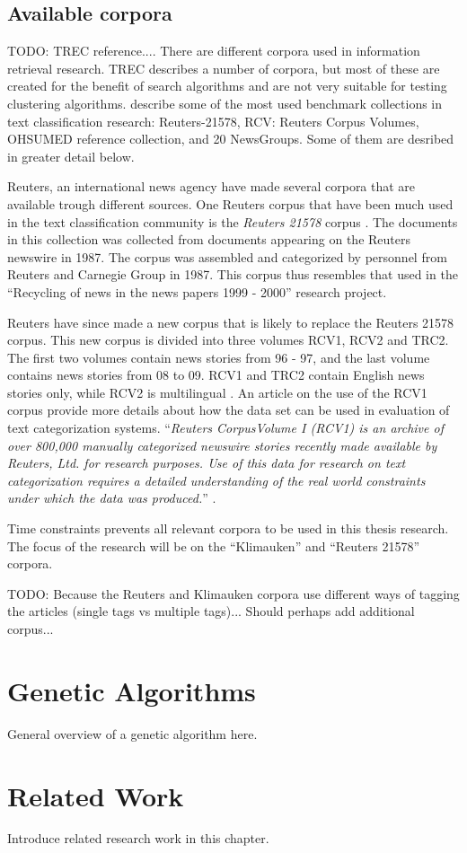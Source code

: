 \subsection{Available corpora}
TODO: TREC reference....
There are different corpora used in information retrieval research. TREC describes a number of corpora, but most of these are created for the benefit of search algorithms and are not very suitable for testing clustering algorithms.  describe some of the most used benchmark collections in text classification research: Reuters-21578, RCV: Reuters Corpus Volumes, OHSUMED reference collection, and 20 NewsGroups. Some of them are desribed in greater detail below.

Reuters, an international news agency have made several corpora that are available trough different sources. One Reuters corpus that have been much used in the text classification community is the \textit{Reuters 21578} corpus \cite{Lewis2004a}. The documents in this collection was collected from documents appearing on the Reuters newswire in 1987. The corpus was assembled and categorized by personnel from Reuters and Carnegie Group in 1987. This corpus thus resembles that used in the ``Recycling of news in the news papers 1999 - 2000'' research project.

Reuters have since made a new corpus that is likely to replace the Reuters 21578 corpus. This new corpus is divided into three volumes RCV1, RCV2 and TRC2. The first two volumes contain news stories from 96 - 97, and the last volume contains news stories from 08 to 09. RCV1 and TRC2 contain English news stories only, while RCV2 is multilingual \cite{NationalInstituteofStandardsandTechnology2004}. An article on the use of the RCV1 corpus provide more details about how the data set can be used in evaluation of text categorization systems. ``\textit{Reuters CorpusVolume I (RCV1) is an archive of over 800,000 manually categorized newswire stories recently made available by Reuters, Ltd. for research purposes. Use of this data for research on text categorization requires a detailed understanding of the real world constraints under which the data was produced.}'' \cite{Lewis2004}. 

Time constraints prevents all relevant corpora to be used in this thesis research. The focus of the research will be on the ``Klimauken'' and ``Reuters 21578'' corpora. 

TODO: Because the Reuters and Klimauken corpora use different ways of tagging the articles (single tags vs multiple tags)... Should perhaps add additional corpus...


\section{Genetic Algorithms}
\label{GeneticAlgorithm}
General overview of a genetic algorithm here.


\section{Related Work}
\label{RelatedWork}
Introduce related research work in this chapter.